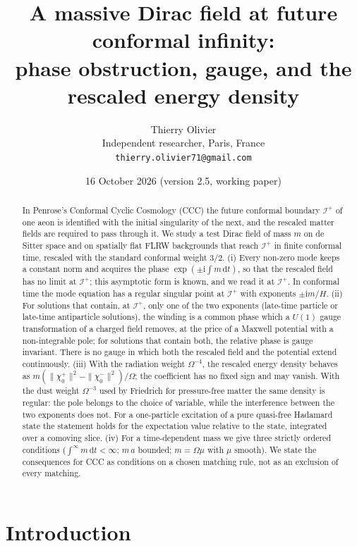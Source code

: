 \documentclass[11pt,a4paper]{article}
\title{\textbf{A massive Dirac field at future conformal infinity:\\ phase obstruction, gauge, and the rescaled energy density}}
\author{Thierry Olivier\\ \small Independent researcher, Paris, France\\ \small \texttt{thierry.olivier71@gmail.com}}
\date{16 October 2026 \quad (version 2.5, working paper)}
\theoremstyle{definition}
\newcommand{\scri}{\mathscr{I}^{+}}
\newcommand{\dd}{\mathrm{d}}
\newcommand{\ii}{\mathrm{i}}
\begin{document}
\maketitle

\begin{abstract}
In Penrose's Conformal Cyclic Cosmology (CCC) the future conformal boundary $\scri$ of one aeon is identified with the initial singularity of the next, and the rescaled matter fields are required to pass through it. We study a test Dirac field of mass $m$ on de Sitter space and on spatially flat FLRW backgrounds that reach $\scri$ in finite conformal time, rescaled with the standard conformal weight $3/2$. (i) Every non-zero mode keeps a constant norm and acquires the phase $\exp(\pm\ii\int m\,\dd t)$, so that the rescaled field has no limit at $\scri$; this asymptotic form is known, and we read it at $\scri$. In conformal time the mode equation has a regular singular point at $\scri$ with exponents $\pm\ii m/H$. (ii) For solutions that contain, at $\scri$, only one of the two exponents (late-time particle or late-time antiparticle solutions), the winding is a common phase which a $U(1)$ gauge transformation of a charged field removes, at the price of a Maxwell potential with a non-integrable pole; for solutions that contain both, the relative phase is gauge invariant. There is no gauge in which both the rescaled field and the potential extend continuously. (iii) With the radiation weight $\Omega^{-4}$, the rescaled energy density behaves as $m(\|\chi_{0}^{+}\|^{2}-\|\chi_{0}^{-}\|^{2})/\Omega$; the coefficient has no fixed sign and may vanish. With the dust weight $\Omega^{-3}$ used by Friedrich for pressure-free matter the same density is regular: the pole belongs to the choice of variable, while the interference between the two exponents does not. For a one-particle excitation of a pure quasi-free Hadamard state the statement holds for the expectation value relative to the state, integrated over a comoving slice. (iv) For a time-dependent mass we give three strictly ordered conditions ($\int^{\infty}m\,\dd t<\infty$; $m\,a$ bounded; $m=\Omega\mu$ with $\mu$ smooth). We state the consequences for CCC as conditions on a chosen matching rule, not as an exclusion of every matching.
\end{abstract}

\section{Introduction}
\end{document}

